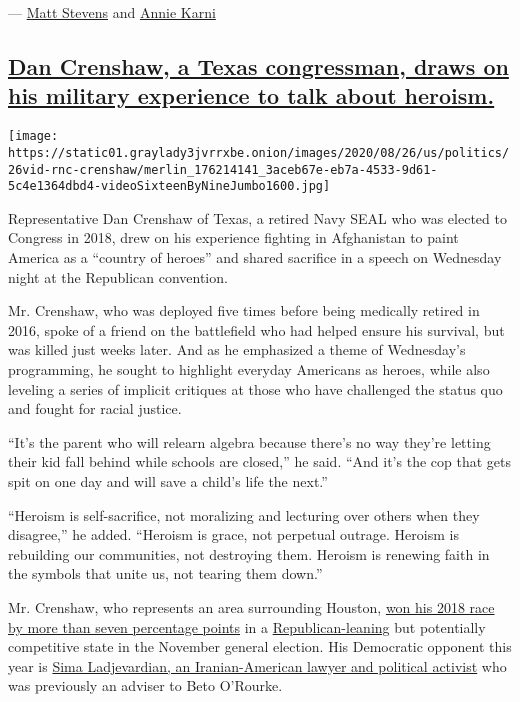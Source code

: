 --- \href{https://www.nytimes3xbfgragh.onion/by/matt-stevens}{Matt
Stevens} and
\href{https://www.nytimes3xbfgragh.onion/by/annie-karni}{Annie Karni}

\hypertarget{dan-crenshaw-a-texas-congressman-draws-on-his-military-experience-to-talk-about-heroism}{%
\subsection{\texorpdfstring{\protect\hyperlink{dan-crenshaw-a-texas-congressman-draws-on-his-military-experience-to-talk-about-heroism}{Dan
Crenshaw, a Texas congressman, draws on his military experience to talk
about
heroism.}}{Dan Crenshaw, a Texas congressman, draws on his military experience to talk about heroism.}}\label{dan-crenshaw-a-texas-congressman-draws-on-his-military-experience-to-talk-about-heroism}}

\texttt{[image: https://static01.graylady3jvrrxbe.onion/images/2020/08/26/us/politics/26vid-rnc-crenshaw/merlin\_176214141\_3aceb67e-eb7a-4533-9d61-5c4e1364dbd4-videoSixteenByNineJumbo1600.jpg]}

Representative Dan Crenshaw of Texas, a retired Navy SEAL who was
elected to Congress in 2018, drew on his experience fighting in
Afghanistan to paint America as a ``country of heroes'' and shared
sacrifice in a speech on Wednesday night at the Republican convention.

Mr. Crenshaw, who was deployed five times before being medically retired
in 2016, spoke of a friend on the battlefield who had helped ensure his
survival, but was killed just weeks later. And as he emphasized a theme
of Wednesday's programming, he sought to highlight everyday Americans as
heroes, while also leveling a series of implicit critiques at those who
have challenged the status quo and fought for racial justice.

``It's the parent who will relearn algebra because there's no way
they're letting their kid fall behind while schools are closed,'' he
said. ``And it's the cop that gets spit on one day and will save a
child's life the next.''

``Heroism is self-sacrifice, not moralizing and lecturing over others
when they disagree,'' he added. ``Heroism is grace, not perpetual
outrage. Heroism is rebuilding our communities, not destroying them.
Heroism is renewing faith in the symbols that unite us, not tearing them
down.''

Mr. Crenshaw, who represents an area surrounding Houston,
\href{https://www.nytimes3xbfgragh.onion/elections/results/texas-house-district-2}{won
his 2018 race by more than seven percentage points} in a
\href{https://cookpolitical.com/sites/default/files/2020-07/EC\%20Ratings.072320.2.pdf}{Republican-leaning}
but potentially competitive state in the November general election. His
Democratic opponent this year is
\href{https://www.washingtonpost.com/opinions/2020/08/26/dan-crenshaw-sima-ladjevardian-texas-congressional-race/}{Sima
Ladjevardian, an Iranian-American lawyer and political activist} who was
previously an adviser to Beto O'Rourke.


